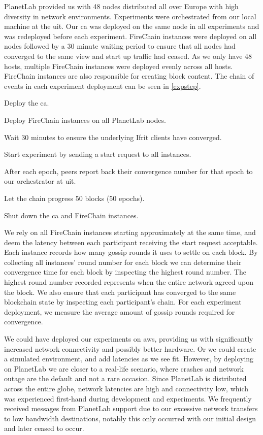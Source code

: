 \documentclass[USenglish]{uit-thesis}
\begin{document}
PlanetLab provided us with 48 nodes distributed all over Europe with high diversity in network environments.
Experiments were orchestrated from our local machine at the \gls{uit}.
Our \gls{ca} was deployed on the same node in all experiments and was redeployed before each experiment.
FireChain instances were deployed on all nodes followed by a 30 minute waiting period to ensure that all nodes had converged to the same view and start up traffic had ceased.
As we only have 48 hosts, multiple FireChain instances were deployed evenly across all hosts.
FireChain instances are also responsible for creating block content.
The chain of events in each experiment deployment can be seen in \autoref{expstep}.
\begin{description}\label{expstep}
	\item[Step 1] Deploy the \gls{ca}.
	\item[Step 2] Deploy FireChain instances on all PlanetLab nodes.
	\item[Step 3] Wait 30 minutes to ensure the underlying Ifrit clients have converged.
	\item[Step 4] Start experiment by sending a start request to all instances.
	\item[Step 5] After each epoch, peers report back their convergence number for that epoch to our orchestrator at \gls{uit}.
	\item[Step 6] Let the chain progress 50 blocks (50 epochs).
	\item[Step 7] Shut down the \gls{ca} and FireChain instances.
\end{description}
We rely on all FireChain instances starting approximately at the same time, and deem the latency between each participant receiving the start request acceptable. 
Each instance records how many gossip rounds it uses to settle on each block.
By collecting all instances' round number for each block we can determine their convergence time for each block by inspecting the highest round number.
The highest round number recorded represents when the entire network agreed upon the block.
We also ensure that each participant has converged to the same blockchain state by inspecting each participant's chain.
For each experiment deployment, we measure the average amount of gossip rounds required for convergence.

We could have deployed our experiments on \gls{aws}, providing us with significantly increased network connectivity and possibly better hardware.
Or we could create a simulated environment, and add latencies as we see fit.
However, by deploying on PlanetLab we are closer to a real-life scenario, where crashes and network outage are the default and not a rare occasion.
Since PlanetLab is distributed across the entire globe, network latencies are high and connectivity low, which was experienced first-hand during development and experiments.
We frequently received messages from PlanetLab support due to our excessive network transfers to low bandwidth destinations, notably this only occurred with our initial design and later ceased to occur. 
\end{document}

